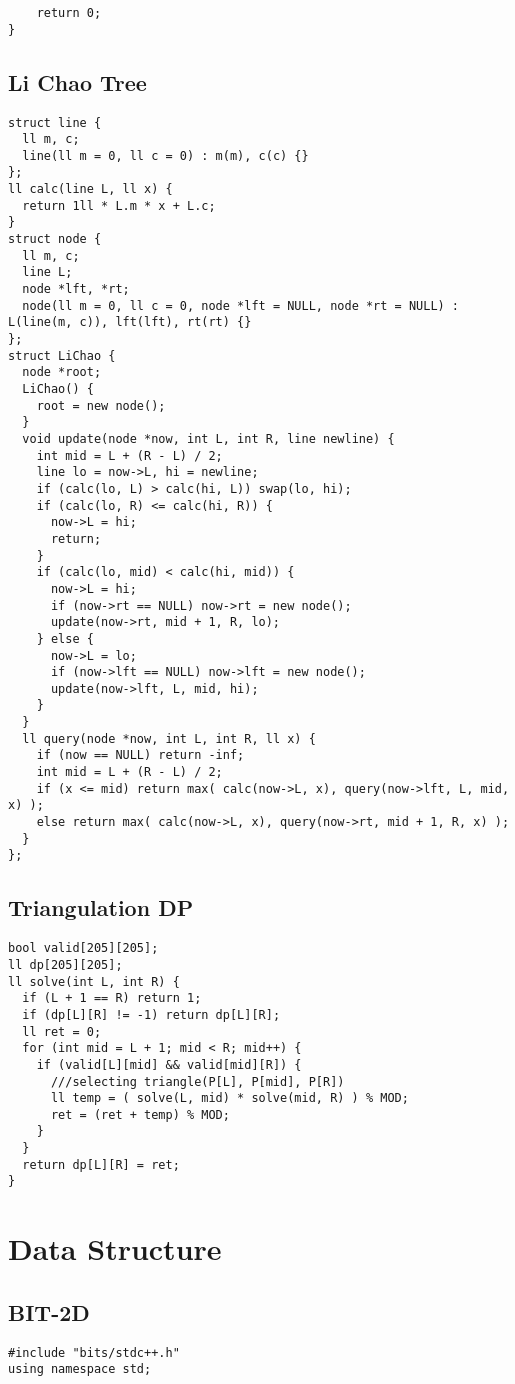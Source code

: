 \documentclass[FSZ,a4paper,onesided]{article}
\begin{document}
\begin{multicols*}{\COLS}
\begin{lstlisting}
    return 0;
}
\end{lstlisting}
\subsection{Li Chao Tree}
\begin{lstlisting}
struct line {
  ll m, c;
  line(ll m = 0, ll c = 0) : m(m), c(c) {}
};
ll calc(line L, ll x) {
  return 1ll * L.m * x + L.c;
}
struct node {
  ll m, c;
  line L;
  node *lft, *rt;
  node(ll m = 0, ll c = 0, node *lft = NULL, node *rt = NULL) : L(line(m, c)), lft(lft), rt(rt) {}
};
struct LiChao {
  node *root;
  LiChao() {
    root = new node();
  }
  void update(node *now, int L, int R, line newline) {
    int mid = L + (R - L) / 2;
    line lo = now->L, hi = newline;
    if (calc(lo, L) > calc(hi, L)) swap(lo, hi);
    if (calc(lo, R) <= calc(hi, R)) {
      now->L = hi;
      return;
    }
    if (calc(lo, mid) < calc(hi, mid)) {
      now->L = hi;
      if (now->rt == NULL) now->rt = new node();
      update(now->rt, mid + 1, R, lo);
    } else {
      now->L = lo;
      if (now->lft == NULL) now->lft = new node();
      update(now->lft, L, mid, hi);
    }
  }
  ll query(node *now, int L, int R, ll x) {
    if (now == NULL) return -inf;
    int mid = L + (R - L) / 2;
    if (x <= mid) return max( calc(now->L, x), query(now->lft, L, mid, x) );
    else return max( calc(now->L, x), query(now->rt, mid + 1, R, x) );
  }
};
\end{lstlisting}
\subsection{Triangulation DP}
\begin{lstlisting}
bool valid[205][205];
ll dp[205][205];
ll solve(int L, int R) {
  if (L + 1 == R) return 1;
  if (dp[L][R] != -1) return dp[L][R];
  ll ret = 0;
  for (int mid = L + 1; mid < R; mid++) {
    if (valid[L][mid] && valid[mid][R]) {
      ///selecting triangle(P[L], P[mid], P[R])
      ll temp = ( solve(L, mid) * solve(mid, R) ) % MOD;
      ret = (ret + temp) % MOD;
    }
  }
  return dp[L][R] = ret;
}
\end{lstlisting}
\section{Data Structure}
\subsection{BIT-2D}
\begin{lstlisting}
#include "bits/stdc++.h"
using namespace std;
 

\end{lstlisting}
\end{multicols*}
\end{document}
